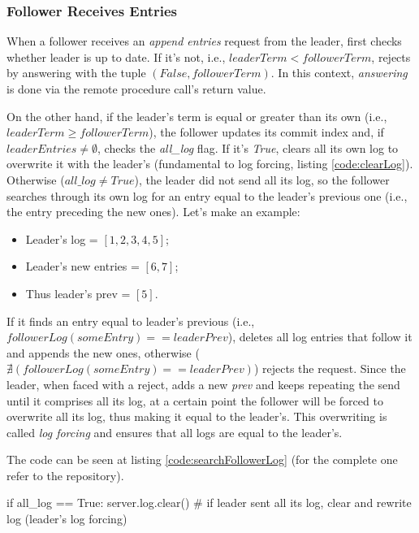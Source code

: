 \subsubsection{Follower Receives Entries}

When a follower receives an \textit{append entries} request from the leader, first checks whether leader is up to date. If it's not, i.e., $leaderTerm < followerTerm$, rejects by answering with the tuple $(False, followerTerm)$. In this context, \textit{answering} is done via the remote procedure call's return value.

On the other hand, if the leader's term is equal or greater than its own (i.e., $leaderTerm \geq followerTerm$), the follower updates its commit index and, if $leaderEntries \neq \emptyset$, checks the \textit{all\_log} flag. If it's \textit{True}, clears all its own log to overwrite it with the leader's (fundamental to log forcing, listing \ref{code:clearLog}). Otherwise ($all\_log \neq True$), the leader did not send all its log, so the follower searches through its own log for an entry equal to the leader's previous one (i.e., the entry preceding the new ones). Let's make an example: 

\begin{itemize}
    \item Leader's log = $[1, 2, 3, 4, 5]$;
    \item Leader's new entries = $[6, 7]$;
    \item Thus leader's prev = $[5]$.
\end{itemize}

If it finds an entry equal to leader's previous (i.e., $followerLog(someEntry) == leaderPrev$), deletes all log entries that follow it and appends the new ones, otherwise ($\nexists(followerLog(someEntry) == leaderPrev)$) rejects the request. Since the leader, when faced with a reject, adds a new \textit{prev} and keeps repeating the send until it comprises all its log, at a certain point the follower will be forced to overwrite all its log, thus making it equal to the leader's. This overwriting is called \textit{log forcing} and ensures that all logs are equal to the leader's.

The code can be seen at listing \ref{code:searchFollowerLog} (for the complete one refer to the repository).

\begin{python}[label={code:clearLog}, caption={Follower clears its own log to overwrite it with the leader's}]
if all_log == True:
    server.log.clear() # if leader sent all its log, clear and rewrite log (leader's log forcing)
\end{python}

